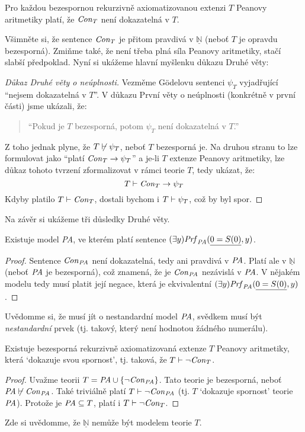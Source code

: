 \begin{theorem}
Pro každou bezespornou rekurzivně axiomatizovanou extenzi $T$ Peanovy aritmetiky platí, že $\mathit{Con}_T$ není dokazatelná v $T$.    
\end{theorem}

Všimněte si, že sentence $\mathit{Con}_T$ je přitom pravdivá v $\underline{\mathbb N}$ (neboť $T$ je opravdu bezesporná). Zmiňme také, že není třeba plná síla Peanovy aritmetiky, stačí slabší předpoklad. Nyní si ukážeme hlavní myšlenku důkazu Druhé věty:

\begin{proof}[Důkaz Druhé věty o neúplnosti]
Vezměme Gödelovu sentenci $\psi_T$ vyjadřující ``nejsem dokazatelná v $T$''. V důkazu První věty o neúplnosti (konkrétně v první části) jsme ukázali, že:
\begin{quote}
    ``Pokud je $T$ bezesporná, potom $\psi_T$ není dokazatelná v $T$.''
\end{quote}
Z toho jednak plyne, že $T\not\vdash\psi_T$, neboť $T$ bezesporná je. Na druhou stranu to lze formulovat jako ``platí $\mathit{Con}_T\to \psi_T$'' a je-li $T$ extenze Peanovy aritmetiky, lze důkaz tohoto tvrzení zformalizovat v rámci teorie $T$, tedy ukázat, že:
$$
T\vdash\mathit{Con}_T\to\psi_T
$$
Kdyby platilo $T\vdash\mathit{Con}_T$, dostali bychom i $T\vdash\psi_T$, což by byl spor.
\end{proof}

Na závěr si ukážeme tři důsledky Druhé věty.

\begin{corollary}
    Existuje model {\it PA}, ve kterém platí sentence $(\exists y)\mathit{Prf}_{\text{\it PA}}(\underline{0=S(0)},y)$.
\end{corollary}
\begin{proof}
    Sentence $\mathit{Con}_{\text{\it PA}}$ není dokazatelná, tedy ani pravdivá v $\text{\it PA}$. Platí ale v $\underline{\mathbb N}$ (neboť $\text{\it PA}$ je bezesporná), což znamená, že je $\mathit{Con}_{\text{\it PA}}$ nezávislá v $\text{\it PA}$. V nějakém modelu tedy musí platit její negace, která je ekvivalentní $(\exists y)\mathit{Prf}_{\text{\it PA}}(\underline{0=S(0)},y)$.
        
\end{proof}
Uvědomme si, že musí jít o nestandardní model $\text{\it PA}$, svědkem musí být    
\emph{nestandardní} prvek (tj. takový, který není hodnotou žádného numerálu).

\begin{corollary}
    Existuje bezesporná rekurzivně axiomatizovaná extenze $T$    Peanovy aritmetiky, která `dokazuje svou spornost', tj. taková, že $T\vdash \neg \mathit{Con}_T$.
\end{corollary}
\begin{proof}
Uvažme teorii $T=\text{\it PA} \cup \{\neg \mathit{Con}_{\text{\it PA}}\}$. Tato teorie je bezesporná, neboť $\text{\it PA}\not\vdash\mathit{Con}_{\text{\it PA}}$. Také triviálně platí $T\vdash\neg\mathit{Con}_{\text{\it PA}}$ (tj. $T$ `dokazuje spornost' teorie $\text{\it PA}$). Protože je $\text{\it PA}\subseteq T$, platí i $T\vdash\neg\mathit{Con}_T$.
\end{proof}
Zde si uvědomme, že $\underline{\mathbb{N}}$ nemůže být modelem teorie $T$.

